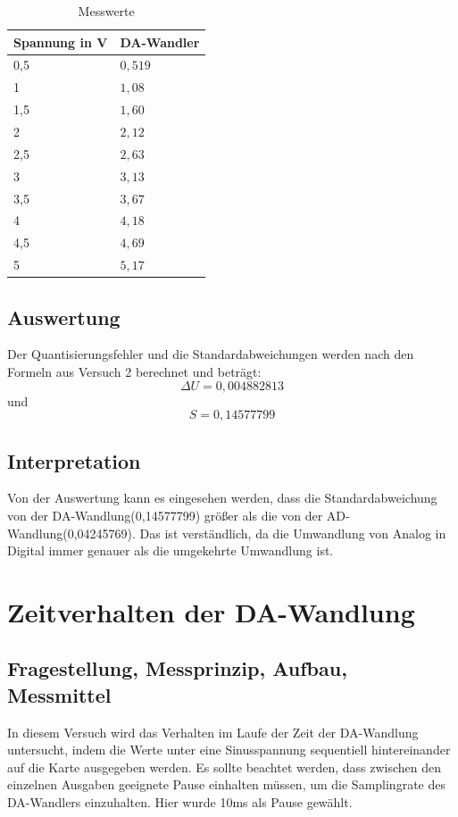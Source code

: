 \documentclass[12pt, oneside, a4paper, \docLanguage]{report}
\begin{document}
\begin{table}[H]
\centering
\begin{tabular}{|l|l|}
\hline
\multicolumn{1}{|c|}{Spannung in V} & \multicolumn{1}{c|}{DA-Wandler}		\\ \hline
0,5						&$0,519$			\\ \hline
1						&$1,08$				\\ \hline
1,5						&$1,60$				\\ \hline
2						&$2,12$				\\ \hline
2,5						&$2,63$				\\ \hline
3						&$3,13$				\\ \hline
3,5						&$3,67$				\\ \hline
4						&$4,18$				\\ \hline
4,5						&$4,69$				\\ \hline
5						&$5,17$				\\ \hline
\end{tabular}
\caption{Messwerte}
\end{table}
\section{Auswertung}

\label{chap:VERSUCH_3_AUSWERTUNG}

\qquad Der Quantisierungsfehler und die Standardabweichungen werden nach den Formeln aus Versuch 2 berechnet und beträgt:$$\Delta{U}=0,004882813$$ und $$S=0,14577799$$



\section{Interpretation}
\label{chap:VERSUCH_3_INTERPRETATION}
\qquad Von der Auswertung kann es eingesehen werden, dass die Standardabweichung von der DA-Wandlung(0,14577799) größer als die von der AD-Wandlung(0,04245769). Das ist verständlich, da die Umwandlung von Analog in Digital immer genauer als die umgekehrte Umwandlung ist.



%
%
\chapter{Zeitverhalten der DA-Wandlung}
\section{Fragestellung, Messprinzip, Aufbau, Messmittel}
\qquad In diesem Versuch wird das Verhalten im Laufe der Zeit der DA-Wandlung untersucht, indem die Werte unter eine Sinusspannung sequentiell hintereinander auf die Karte ausgegeben werden. Es sollte beachtet werden, dass zwischen den einzelnen Ausgaben geeignete Pause einhalten müssen, um die Samplingrate des DA-Wandlers einzuhalten. Hier wurde 10ms als Pause gewählt.
\end{document}
